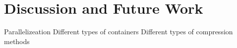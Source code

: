 \chapter{Discussion and Future Work}
\label{ch:conclusion}

Parallelizeation
Different types of containers
Different types of compression methods
 